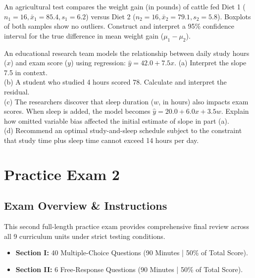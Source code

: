 \begin{workbookbox}
An agricultural test compares the weight gain (in pounds) of cattle fed Diet 1 ($n_1 = 16, \bar{x}_1 = 85.4, s_1 = 6.2$) versus Diet 2 ($n_2 = 16, \bar{x}_2 = 79.1, s_2 = 5.8$). Boxplots of both samples show no outliers.
Construct and interpret a 95\% confidence interval for the true difference in mean weight gain ($\mu_1 - \mu_2$).
\end{workbookbox}

\begin{workbookbox}
An educational research team models the relationship between daily study hours ($x$) and exam score ($y$) using regression: $\hat{y} = 42.0 + 7.5x$.
(a) Interpret the slope 7.5 in context.\\
(b) A student who studied 4 hours scored 78. Calculate and interpret the residual.\\
(c) The researchers discover that sleep duration ($w$, in hours) also impacts exam scores. When sleep is added, the model becomes $\hat{y} = 20.0 + 6.0x + 3.5w$. Explain how omitted variable bias affected the initial estimate of slope in part (a).\\
(d) Recommend an optimal study-and-sleep schedule subject to the constraint that study time plus sleep time cannot exceed 14 hours per day.
\end{workbookbox}

\chapter{Practice Exam 2}

\section*{Exam Overview \& Instructions}
This second full-length practice exam provides comprehensive final review across all 9 curriculum units under strict testing conditions.
\begin{itemize}[leftmargin=1.2em]
  \item \textbf{Section I:} 40 Multiple-Choice Questions (90 Minutes | 50\% of Total Score).
  \item \textbf{Section II:} 6 Free-Response Questions (90 Minutes | 50\% of Total Score).
\end{itemize}

